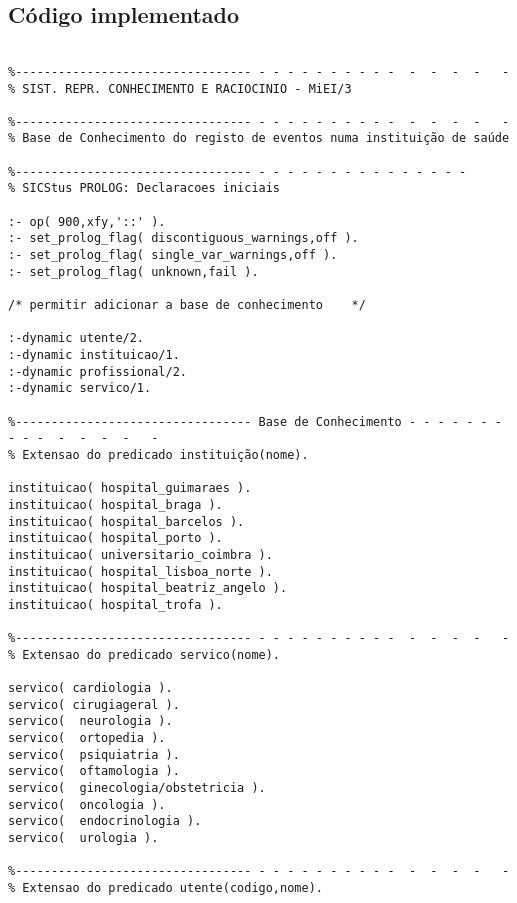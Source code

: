 \documentclass[pdftex,12pt,a4paper]{report}
\begin{document}


\tableofcontents
\listoffigures 





\begin{appendices}
	\chapter{Código implementado}
\begin{Verbatim}

%--------------------------------- - - - - - - - - - -  -  -  -  -   -
% SIST. REPR. CONHECIMENTO E RACIOCINIO - MiEI/3

%--------------------------------- - - - - - - - - - -  -  -  -  -   -
% Base de Conhecimento do registo de eventos numa instituição de saúde

%--------------------------------- - - - - - - - - - - - - - - -
% SICStus PROLOG: Declaracoes iniciais

:- op( 900,xfy,'::' ).
:- set_prolog_flag( discontiguous_warnings,off ).
:- set_prolog_flag( single_var_warnings,off ).
:- set_prolog_flag( unknown,fail ).

/* permitir adicionar a base de conhecimento	*/

:-dynamic utente/2.
:-dynamic instituicao/1.
:-dynamic profissional/2.
:-dynamic servico/1.

%--------------------------------- Base de Conhecimento - - - - - - - - - -  -  -  -  -   -
% Extensao do predicado instituição(nome). 

instituicao( hospital_guimaraes ). 
instituicao( hospital_braga ).
instituicao( hospital_barcelos ).
instituicao( hospital_porto ).
instituicao( universitario_coimbra ).
instituicao( hospital_lisboa_norte ).
instituicao( hospital_beatriz_angelo ).
instituicao( hospital_trofa ).

%--------------------------------- - - - - - - - - - -  -  -  -  -   -
% Extensao do predicado servico(nome).

servico( cardiologia ). 
servico( cirugiageral ).
servico(  neurologia ).
servico(  ortopedia ).
servico(  psiquiatria ).
servico(  oftamologia ).
servico(  ginecologia/obstetricia ).
servico(  oncologia ).
servico(  endocrinologia ).
servico(  urologia ).  

%--------------------------------- - - - - - - - - - -  -  -  -  -   -
% Extensao do predicado utente(codigo,nome).


\end{Verbatim}
\end{appendices}
\end{document}
